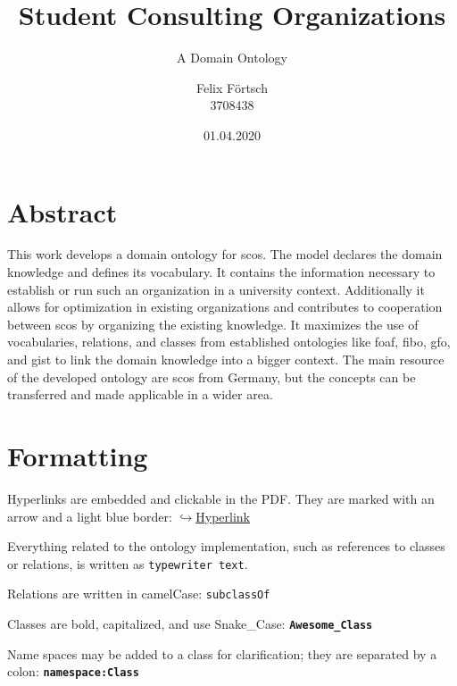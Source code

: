 \documentclass[a4paper, DIV=13, BCOR=0cm]{scrbook}
\newcommand{\class}[1]{\texttt{\textbf{#1}}}
\newcommand{\link}[2]{\href{#1}{$\hookrightarrow$#2}}
\begin{document}
\titlehead{Overall Progress: }
\subject{Bachelor's Thesis}
\title{Student Consulting Organizations}
\subtitle{A Domain Ontology}
\author{Felix Förtsch \\ 3708438}
\date{01.04.2020}
\publishers{Leipzig University}
\maketitle

\frontmatter
\chapter*{Abstract }
	This work develops a domain ontology for \glspl{sco}. The model declares the domain knowledge and defines its vocabulary. It contains the information necessary to establish or run such an organization in a university context. Additionally it allows for optimization in existing organizations and contributes to cooperation between \glspl{sco} by organizing the existing knowledge. It maximizes the use of vocabularies, relations, and classes from established ontologies like \gls{foaf}, \gls{fibo}, \gls{gfo}, and \gls{gist} to link the domain knowledge into a bigger context. The main resource of the developed ontology are \glspl{sco} from Germany, but the concepts can be transferred and made applicable in a wider area.

\chapter*{Formatting}
\begin{compactitem}
	\item Hyperlinks are embedded and clickable in the PDF. They are marked with an arrow and a light blue border: \link{https://hyperlink.com}{Hyperlink}
	\item Everything related to the ontology implementation, such as references to classes or relations, is written as \texttt{typewriter text}.
	\item Relations are written in camelCase: \texttt{subclassOf}
	\item Classes are bold, capitalized, and use Snake\_Case: \texttt{\textbf{Awesome\_Class}}
	\item Name spaces may be added to a class for clarification; they are separated by a colon: \class{namespace:Class}
\end{compactitem}
\end{document}
